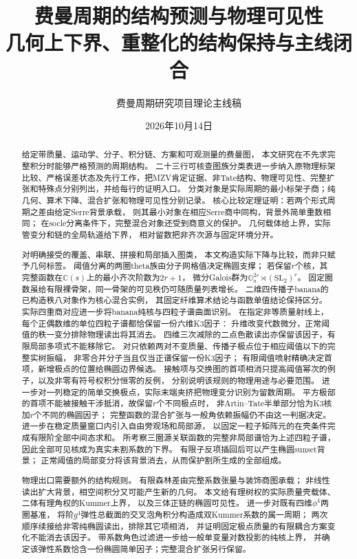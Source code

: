 \documentclass[11pt,a4paper]{ctexart}
\title{费曼周期的结构预测与物理可见性\\[4pt]
\large 几何上下界、重整化的结构保持与主线闭合}
\author{费曼周期研究项目\quad 理论主线稿}
\date{2026年10月14日}
\theoremstyle{cnplain}\newtheorem{theorem}{定理}[section]
\theoremstyle{definition}\newtheorem{definition}[theorem]{定义}
\theoremstyle{remark}\newtheorem{remark}[theorem]{注}
\begin{document}
\maketitle
\begin{abstract}
给定带质量、运动学、分子、积分链、方案和可观测量的费曼图，
本文研究在不先求完整积分时能够严格预测的周期结构。
二十三行可核查图族分类表进一步纳入原物理标架比较、严格误差状态及先行工作，把MZV肯定证据、非Tate结构、物理可见性、完整扩张和特殊点分别列出，并给每行的证明入口。
分类对象是实际周期的最小标架子商；纯几何、算术下降、混合扩张和物理可见性分别记录。
核心比较定理证明：若两个形式周期之差由给定Serre背景承载，
则其最小对象在相应Serre商中同构，背景外简单重数相同；
在socle分离条件下，完整混合对象还受到商意义的保护。
几何载体给上界，实际管变分和链的全局轨道给下界，
相对留数把非齐次源与固定环境分开。

对明确接受的覆盖、串联、拼接和局部插入图类，
本文构造实际下降与比较，而非只赋予几何标签。
阈值分离的两圈theta族由分子网格值决定椭圆支撑；
若保留$r$个核，其完整函数在$\mathbb C(s)$上的最小齐次阶数为$2r+1$，
微分Galois群为$\mathbb G_a^{2r}\rtimes(\mathrm{SL}_2)^r$。
固定圈数虽给有限裸骨架，同一骨架的可见秩仍可随质量列表增长。
二维四传播子banana的已构造秩八对象作为核心混合实例，
其固定纤维算术结论与函数单值结论保持区分。
实际四重商对应进一步将banana纯核与四粒子谱曲面识别。
在指定非等质量射线上，每个正偶数维的单位四粒子谱都恰保留一份六维K3因子：
升维改变代数微分，正常阈值的秩一变分排除物理读出将其消去。
四维三次减除的二点色散读出亦保留该因子，有限局部多项式不能移除它。
对只依赖两对不变质量、传播子极点位于相应阈值以下的完整实树振幅，
非零合并分子当且仅当正谱保留一份K3因子；
有限阈值喷射精确决定首项，新增极点的位置给椭圆边界候选。
接触项与交换图的首项相消只提高阈值幂次的例子，以及非零有符号权积分恒零的反例，
分别说明该规则的物理用途与必要范围。
进一步对一列稳定的简单交换极点，实际末端夹挤把物理变分识别为留数周期。
平方极部的首项不能被接触干涉抵消，故保留$r$个不同极点时，
非Artin--Tate半单部分恰为K3核加$r$个不同的椭圆因子；
完整函数的混合扩张与一般角依赖振幅仍不由这一判据决定。
进一步在稳定质量窗口内引入自由旁观场和局部源，
以固定一粒子矩阵元的在壳条件完成有限阶全部中间态求和。
所考察三圈源关联函数的完整非局部谱恰为上述四粒子谱，
因此全部可见核成为真实未割系数的下界。
有限子反项插回后可以产生椭圆sunset背景；
正常阈值的局部变分将该背景消去，从而保护割所生成的全部组成。

物理出口需要额外的结构规则。
有限森林差由完整系数张量与装饰商图承载；
非线性读出扩大背景，相空间积分又可能产生新的几何。
本文给有理树权的实际质量壳载体、二体有理角权的Kummer上界，
以及三体正链的椭圆可见性。
进一步对既有四维$\phi^4$两圈基准，
将阶$g^4$弹性总截面的交叉泡角积分构造成双Kummer系数的属一周期；
两次顺序续接给非零纯椭圆读出，排除其它项相消，
并证明固定极点质量的有限耦合方案变化不能消去该因子。
带系数角色过滤进一步给一般单变量对数投影的纯核上界，
并确定该弹性系数恰含一份椭圆简单因子；完整混合扩张另行保留。


\end{abstract}
\end{document}
